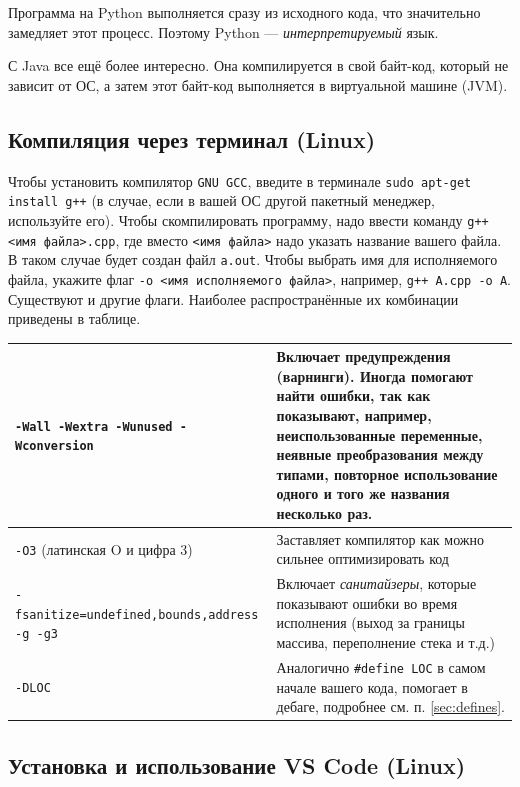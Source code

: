 \documentclass{article}
\begin{document}
	Программа на Python выполняется сразу из исходного кода, что значительно замедляет этот процесс. Поэтому Python --- \textit{интерпретируемый} язык.
	
	С Java все ещё более интересно. Она компилируется в свой байт-код, который не зависит от ОС, а затем этот байт-код выполняется в виртуальной машине (JVM).
	
	\subsection{Компиляция через терминал (Linux)}
	\label{sec:cmd-compile}
	
	Чтобы установить компилятор \texttt{GNU GCC}, введите в терминале \texttt{sudo apt-get install g++} (в случае, если в вашей ОС другой пакетный менеджер, используйте его). Чтобы скомпилировать программу, надо ввести команду \texttt{g++ <имя файла>.cpp}, где вместо \texttt{<имя файла>} надо указать название вашего файла. В таком случае будет создан файл \texttt{a.out}. Чтобы выбрать имя для исполняемого файла, укажите флаг \texttt{-o <имя исполняемого файла>}, например, \texttt{g++ A.cpp -o A}. Существуют и другие флаги. Наиболее распространённые их комбинации приведены в таблице.
	
	\begin{table}[H]
		\centering
		\begin{tabularx}{\textwidth}{|X|X|}
			\hline
			\texttt{-Wall -Wextra -Wunused -Wconversion} & Включает предупреждения (варнинги). Иногда помогают найти ошибки, так как показывают, например, неиспользованные переменные, неявные преобразования между типами, повторное использование одного и того же названия несколько раз.\\
			\hline
			\texttt{-O3} (латинская O и цифра 3) & Заставляет компилятор как можно сильнее оптимизировать код\\
			\hline
			\texttt{-fsanitize=undefined,bounds,address -g -g3} & Включает \textit{санитайзеры}, которые показывают ошибки во время исполнения (выход за границы массива, переполнение стека и т.д.)\\
			\hline
			\texttt{-DLOC} & Аналогично \texttt{\#define LOC} в самом начале вашего кода, помогает в дебаге, подробнее см. п. \ref{sec:defines}.\\
			\hline
		\end{tabularx}
	\end{table}
	
	\subsection{Установка и использование VS Code (Linux)}
	
\end{document}
